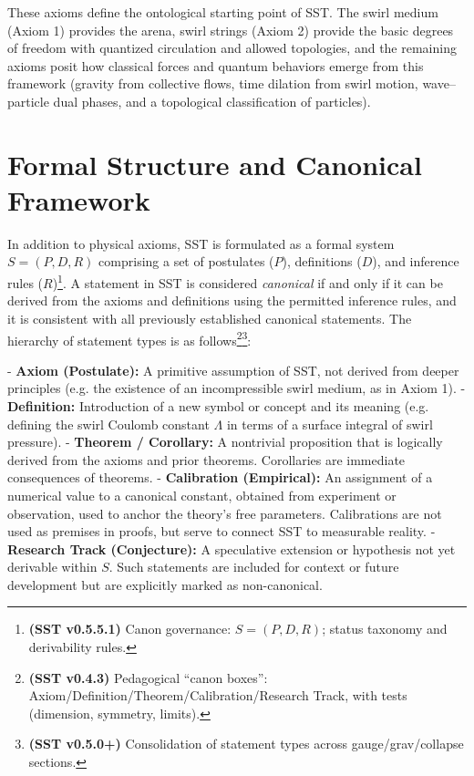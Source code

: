 \documentclass[reprint,aps,onecolumn,nofootinbib]{revtex4-2}
\begin{document}

    These axioms define the ontological starting point of SST. The swirl medium (Axiom 1) provides the arena, swirl strings (Axiom 2) provide the basic degrees of freedom with quantized circulation and allowed topologies, and the remaining axioms posit how classical forces and quantum behaviors emerge from this framework (gravity from collective flows, time dilation from swirl motion, wave–particle dual phases, and a topological classification of particles).

\section{Formal Structure and Canonical Framework}
    In addition to physical axioms, SST is formulated as a formal system $S = (P, D, R)$ comprising a set of postulates ($P$), definitions ($D$), and inference rules ($R$)\footnote{\textbf{(SST v0.5.5.1)} Canon governance: $S=(P,D,R)$; status taxonomy and derivability rules.}. A statement in SST is considered \emph{canonical} if and only if it can be derived from the axioms and definitions using the permitted inference rules, and it is consistent with all previously established canonical statements. The hierarchy of statement types is as follows\footnote{\textbf{(SST v0.4.3)} Pedagogical “canon boxes”: Axiom/Definition/Theorem/Calibration/Research Track, with tests (dimension, symmetry, limits).}\footnote{\textbf{(SST v0.5.0+)} Consolidation of statement types across gauge/grav/collapse sections.}:

    - \textbf{Axiom (Postulate):} A primitive assumption of SST, not derived from deeper principles (e.g. the existence of an incompressible swirl medium, as in Axiom 1).
    - \textbf{Definition:} Introduction of a new symbol or concept and its meaning (e.g. defining the swirl Coulomb constant $\Lambda$ in terms of a surface integral of swirl pressure).
    - \textbf{Theorem / Corollary:} A nontrivial proposition that is logically derived from the axioms and prior theorems. Corollaries are immediate consequences of theorems.
    - \textbf{Calibration (Empirical):} An assignment of a numerical value to a canonical constant, obtained from experiment or observation, used to anchor the theory’s free parameters. Calibrations are not used as premises in proofs, but serve to connect SST to measurable reality.
    - \textbf{Research Track (Conjecture):} A speculative extension or hypothesis not yet derivable within $S$. Such statements are included for context or future development but are explicitly marked as non-canonical.
\end{document}
